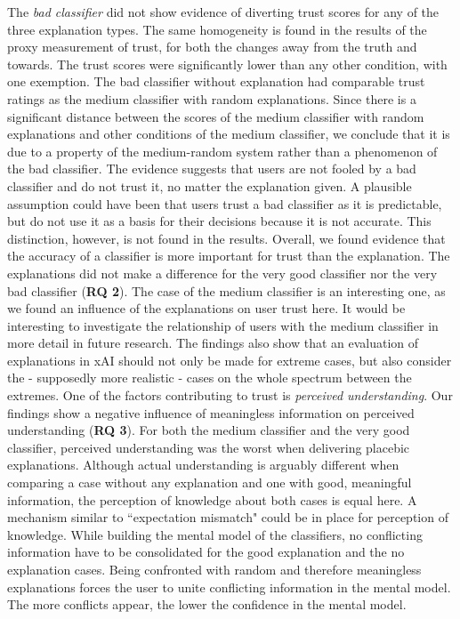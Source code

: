 The \textit{bad classifier} did not show evidence of diverting trust scores for any of the three explanation types. The same homogeneity is found in the results of the proxy measurement of trust, for both the changes away from the truth and towards. The trust scores were significantly lower than any other condition, with one exemption. The bad classifier without explanation had comparable trust ratings as the medium classifier with random explanations. Since there is a significant distance between the scores of the medium classifier with random explanations and other conditions of the medium classifier, we conclude that it is due to a property of the medium-random system rather than a phenomenon of the bad classifier. The evidence suggests that users are not fooled by a bad classifier and do not trust it, no matter the explanation given. A plausible assumption could have been that users trust a bad classifier as it is predictable, but do not use it as a basis for their decisions because it is not accurate. This distinction, however, is not found in the results.\newline
Overall, we found evidence that the accuracy of a classifier is more important for trust than the explanation. The explanations did not make a difference for the very good classifier nor the very bad classifier (\textbf{RQ 2}). The case of the medium classifier is an interesting one, as we found an influence of the explanations on user trust here. It would be interesting to investigate the relationship of users with the medium classifier in more detail in future research. The findings also show that an evaluation of explanations in xAI should not only be made for extreme cases, but also consider the - supposedly more realistic - cases on the whole spectrum between the extremes. \medskip \newline
One of the factors contributing to trust is \textit{perceived understanding}. Our findings show a negative influence of meaningless information on perceived understanding (\textbf{RQ 3}). For both the medium classifier and the very good classifier, perceived understanding was the worst when delivering placebic explanations. Although actual understanding is arguably different when comparing a case without any explanation and one with good, meaningful information, the perception of knowledge about both cases is equal here. A mechanism similar to ``expectation mismatch" could be in place for perception of knowledge. While building the mental model of the classifiers, no conflicting information have to be consolidated for the good explanation and the no explanation cases. Being confronted with random and therefore meaningless explanations forces the user to unite conflicting information in the mental model. The more conflicts appear, the lower the confidence in the mental model.\newline
